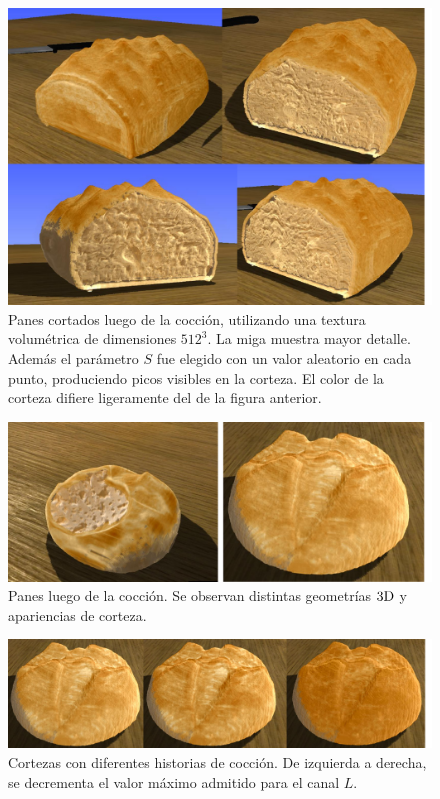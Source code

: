 \begin{figure}[!ht]
\begin{center}
\includegraphics[width=12cm]{figures/Fig11}
\caption[Panes cortados luego de la cocción, utilizando una textura volumétrica de dimensiones $512^{3}$]{Panes cortados luego de la cocción, utilizando una textura volumétrica de dimensiones $512^{3}$. La miga muestra mayor detalle. Además el parámetro $S$ fue elegido con un valor aleatorio en cada punto, produciendo picos visibles en la corteza. El color de la corteza difiere ligeramente del de la figura anterior.}
\label{fg:renders2}
\end{center}
\end{figure}

\begin{figure}[!ht]
\begin{center}
\includegraphics[width=12cm]{figures/Fig12}
\caption[Panes luego de la cocción]{Panes luego de la cocción. Se observan distintas geometrías $\rm 3D$ y apariencias de corteza.}
\label{fg:renders3}
\end{center}
\end{figure}

\begin{figure}[!ht]
\begin{center}
\includegraphics[width=12cm]{figures/Fig13}
\caption[Corteza con diferentes historias de cocción]{Cortezas con diferentes historias de cocción. De izquierda a derecha, se decrementa el valor máximo admitido para el canal $L$.}
\label{fg:bakingcolors}
\end{center}
\end{figure}


